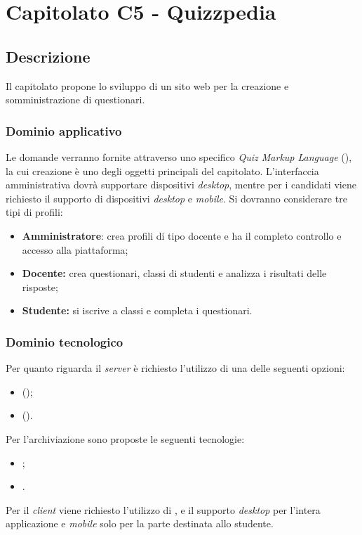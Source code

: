\documentclass[12pt,a4paper]{article}
\begin{document}
\newpage
\section{Capitolato C5 - Quizzpedia}
\subsection{Descrizione}

Il capitolato propone lo sviluppo di un sito web per la creazione e somministrazione di questionari.

\subsubsection{Dominio applicativo}

Le domande verranno fornite attraverso uno specifico \textit{Quiz Markup Language} (), la cui creazione è uno degli oggetti principali del capitolato. L'interfaccia amministrativa dovrà supportare dispositivi \textit{desktop}, mentre per i candidati viene richiesto il supporto di dispositivi \textit{desktop} e \textit{mobile}. Si dovranno considerare tre tipi di profili:

\begin{itemize}
\item \textbf{Amministratore}: crea profili di tipo docente e ha il completo controllo e accesso alla piattaforma;
\item \textbf{Docente:} crea questionari, classi di studenti e analizza i risultati delle risposte;
\item \textbf{Studente:} si iscrive a classi e completa i questionari.
\end{itemize}

\subsubsection{Dominio tecnologico}

Per quanto riguarda il \textit{server} è richiesto l'utilizzo di una delle seguenti opzioni:

\begin{itemize}
\item {} ();
\item {} ().
\end{itemize}
Per l'archiviazione sono proposte le seguenti tecnologie:
\begin{itemize}
\item {};
\item {}.
\end{itemize}
Per il \textit{client} viene richiesto l'utilizzo di ,  e il supporto \textit{desktop} per l'intera applicazione e \textit{mobile} solo per la parte destinata allo studente.
\end{document}
